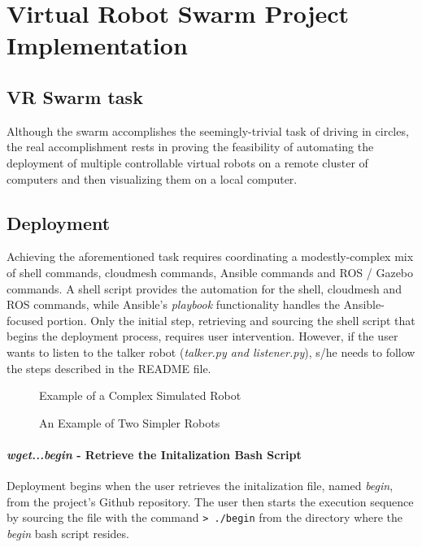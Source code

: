 \documentclass[9pt,twocolumn,twoside]{../../styles/osajnl}
\begin{document}
\section{Virtual Robot Swarm Project Implementation}
\subsection{VR Swarm task}
Although the swarm accomplishes the seemingly-trivial task of driving in circles, the real accomplishment rests in proving the feasibility of automating the deployment of multiple controllable virtual robots on a remote cluster of computers and then visualizing them on a local computer.

\subsection{Deployment}
Achieving the aforementioned task requires coordinating a modestly-complex mix of shell commands, cloudmesh commands, Ansible commands and ROS / Gazebo commands. A shell script provides the automation for the shell, cloudmesh and ROS commands, while Ansible's \textit{playbook} functionality handles the Ansible-focused portion.  Only the initial step, retrieving and sourcing the shell script that begins the deployment process, requires user intervention.  However, if the user wants to listen to the talker robot (\textit{talker.py and listener.py}), s/he needs to follow the steps described in the README file.

\begin{figure}[htbp]
\centering
{}
\caption{Example of a Complex Simulated Robot}
\label{fig:complexRobot}
\end{figure}

\begin{figure}[htbp]
\centering
{}
\caption{An Example of Two Simpler Robots}
\label{fig:simplerRobots}
\end{figure}

\paragraph{\textit{wget...begin} - Retrieve the Initalization Bash Script}
Deployment begins when the user retrieves the initalization file, named \textit{begin}, from the project's Github repository.  The user then starts the execution sequence by sourcing the file with the command \newline
{\color{green} \lstinline[style=BashInputStyle]!> ./begin! } \newline
from the directory where the \textit{begin} bash script resides.  
\end{document}
